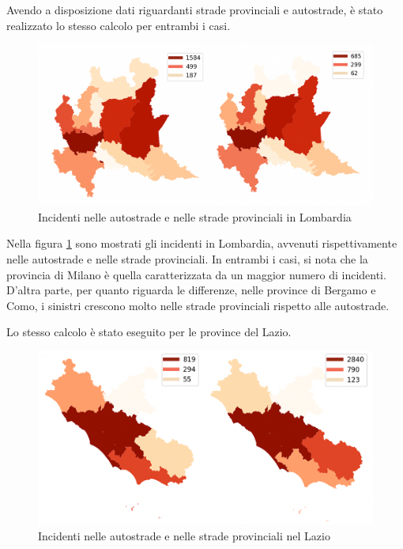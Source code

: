 \documentclass[a4paper,12pt]{report}
\begin{document}
Avendo a disposizione dati riguardanti strade provinciali e autostrade, è stato realizzato 
lo stesso calcolo per entrambi i casi.

\begin{figure}
    \includegraphics[width=\linewidth]{img_unite/lombardia_autostrade_provinciali.png}
    \caption{Incidenti nelle autostrade e nelle strade provinciali in Lombardia}
    \label{fig:lombardia-strade}
\end{figure}

Nella figura \ref{fig:lombardia-strade} sono mostrati gli incidenti in Lombardia, 
avvenuti rispettivamente nelle autostrade e nelle strade provinciali.
In entrambi i casi, si nota che la provincia di Milano è quella caratterizzata da 
un maggior numero di incidenti. 
D'altra parte, per quanto riguarda le differenze, nelle province di Bergamo e Como, 
i sinistri crescono molto nelle strade provinciali rispetto alle autostrade.

Lo stesso calcolo è stato eseguito per le province del Lazio.

\begin{figure}
    \includegraphics[width=\linewidth]{img_unite/lazio_autostrade_provinciali.png}
    \caption{Incidenti nelle autostrade e nelle strade provinciali nel Lazio}
    \label{fig:lazio-strade}
\end{figure}
\end{document}
